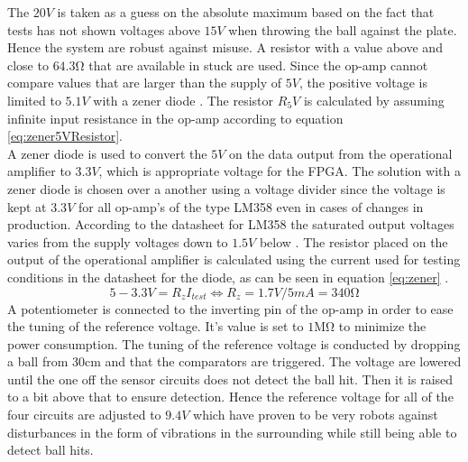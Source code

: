The $20V$ is taken as a guess on the absolute maximum based on the fact that tests has not shown voltages above $15V$ when throwing the ball against the plate. Hence the system are robust against misuse. A resistor with a value above and close to $64.3\si{\ohm}$ that are available in stuck are used.
Since the op-amp cannot compare values that are larger than the supply of $5V$, the positive voltage is limited to $5.1V$ with a zener diode \cite{zener}. The resistor $R_5V$ is calculated by assuming infinite input resistance in the op-amp according to equation \ref{eq:zener5VResistor}.
\begin{equation}
\label{eq:zener5VResistor}
\end{equation}
A zener diode \cite{zener} is used to convert the $5V$ on the data output from the operational amplifier to $3.3V$, which is appropriate voltage for the FPGA. The solution with a zener diode is chosen over a another using a voltage divider since the voltage is kept at $3.3V$ for all op-amp's of the type LM358 even in cases of changes in production. According to the datasheet for LM358 the saturated output voltages varies from the supply voltages down to $1.5V$ below \cite{lm358}.
The resistor placed on the output of the operational amplifier is calculated using the current used for testing conditions in the datasheet for the diode, as can be seen in equation \ref{eq:zener} \cite{zener}.
\begin{equation}
5-3.3V = R_{z} I_{test} \Leftrightarrow R_{z} = 1.7V/5mA = 340\si{\ohm}
\label{eq:zener}
\end{equation}
%
A potentiometer is connected to the inverting pin of the op-amp in order to ease the tuning of the reference voltage. It's value is set to $1\si{\mega\ohm}$ to minimize the power consumption.
The tuning of the reference voltage is conducted by dropping a ball from $30\si{\centi\meter}$  and that the comparators are triggered. The voltage are lowered until the one off the sensor circuits does not detect the ball hit. Then it is raised to a bit above that to ensure detection. Hence the reference voltage for all of the four circuits are adjusted to $9.4V$ which have proven to be very robots against disturbances in the form of vibrations in the surrounding while still being able to detect ball hits.
%
